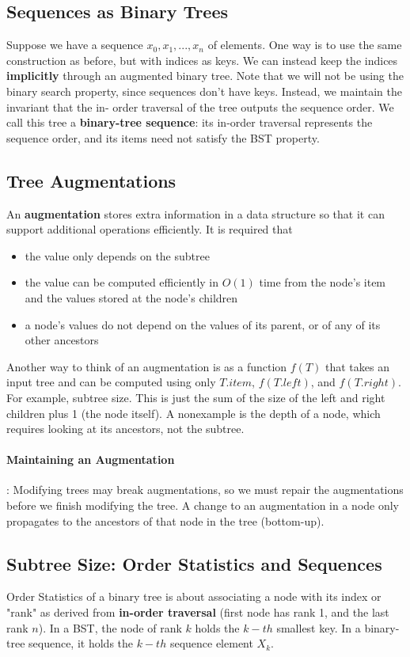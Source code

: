 \documentclass[11pt]{article}
\begin{document}
\subsection{Sequences as Binary Trees}
Suppose we have a sequence $x_0, x_1, ..., x_n$ of elements. One way is to use the same
construction as before, but with indices as keys. We can instead keep the indices 
\textbf{implicitly} through an augmented binary tree. Note that we will not be using the binary
search property, since sequences don't have keys. Instead, we maintain the invariant that the in-
order traversal of the tree outputs the sequence order. We call this tree a \textbf{binary-tree 
sequence}: its in-order traversal represents the sequence order, and its items need not
satisfy the BST property.

\subsection{Tree Augmentations}
An \textbf{augmentation} stores extra information in a data structure so that it can support
additional operations efficiently. It is required that
\begin{itemize}
    \item the value only depends on the subtree
    \item the value can be computed efficiently in $O(1)$ time from the node's item and the values
        stored at the node's children
    \item a node's values do not depend on the values of its parent, or of any of its other
        ancestors
\end{itemize}
Another way to think of an augmentation is as a function $f(T)$ that takes an input tree and can be
computed using only $T.item$, $f(T.left)$, and $f(T.right)$. For example, subtree size. This is just
the sum of the size of the left and right children plus 1 (the node itself). A nonexample is the
depth of a node, which requires looking at its ancestors, not the subtree.

\paragraph{Maintaining an Augmentation}: Modifying trees may break augmentations, so we must repair
the augmentations before we finish modifying the tree. A change to an augmentation in a node only
propagates to the ancestors of that node in the tree (bottom-up).

\subsection{Subtree Size: Order Statistics and Sequences}
Order Statistics of a binary tree is about associating a node with its index or "rank" as derived
from \textbf{in-order traversal} (first node has rank 1, and the last rank $n$). In a BST, the
node of rank $k$ holds the $k-th$ smallest key. In a binary-tree sequence, it holds the $k-th$ 
sequence element $X_{k}$.
\end{document}
